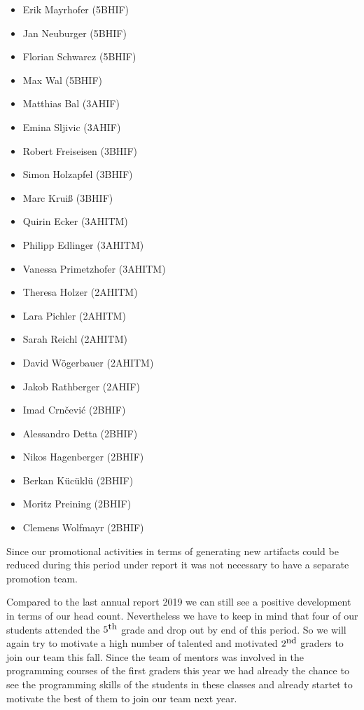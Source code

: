 \documentclass[11pt]{article}
\begin{document}
\begin{multicols}{2}
\begin{itemize}
	\item Erik Mayrhofer (5BHIF)
	\item Jan Neuburger (5BHIF)
	\item Florian Schwarcz (5BHIF)
	\item Max Wal (5BHIF)
	\item Matthias Bal (3AHIF)
	\item Emina Sljivic (3AHIF)
	\item Robert Freiseisen (3BHIF)
	\item Simon Holzapfel (3BHIF)
	\item Marc Kruiß (3BHIF)
	\item Quirin Ecker (3AHITM)
	\item Philipp Edlinger (3AHITM)
	\item Vanessa Primetzhofer (3AHITM)
	\item Theresa Holzer (2AHITM)
	\item Lara Pichler (2AHITM)
	\item Sarah Reichl (2AHITM)
	\item David Wögerbauer (2AHITM)
	\item Jakob Rathberger (2AHIF)
	\item Imad Crnčević (2BHIF)
	\item Alessandro Detta (2BHIF)
	\item Nikos Hagenberger (2BHIF)
	\item Berkan Kücüklü (2BHIF)
	\item Moritz Preining (2BHIF)
	\item Clemens Wolfmayr (2BHIF)
\end{itemize}
\end{multicols}

\noindent Since our promotional activities in terms of generating new artifacts could be reduced during this period under report it was not necessary to have a separate promotion team.

Compared to the last annual report 2019 we can still see a positive development in terms of our head count. Nevertheless we have to keep in mind that four of our students attended the $5^{\textrm{\small th}}$ grade and drop out by end of this period. So we will again try to motivate a high number of talented and motivated $2^{\textrm{\small nd}}$ graders to join our team this fall. Since the team of mentors was involved in the programming courses of the first graders this year we had already the chance to see the programming skills of the students in these classes and already startet to motivate the best of them to join our team next year.
\end{document}
